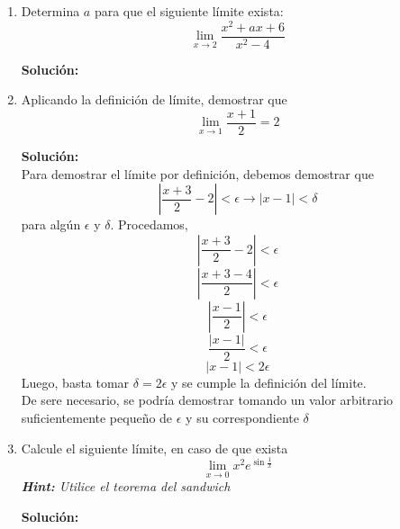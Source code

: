 \documentclass[12pt]{article}
\newenvironment{solucion}
{\begin{mdframed}[backgroundcolor=black!10]
		{\bf Solución:}\\
	}
	{
	\end{mdframed}
}
\newenvironment{preguntas}
{\begin{enumerate}\itemsep12pt
	}
	{
	\end{enumerate}
}
\newcommand{\ra}{\rightarrow}
\begin{document}
\begin{preguntas}
\begin{solucion}
\begin{enumerate}[a)]
\[\begin{array}{rrrrrr}
& 1 & 3& 0 & 4 & 0
\end{array}
\]
por lo que $x^4+2x^3-3x^2+4x-4 : x-1 = x^3+3x^2+4$\\
Luego, $x^4+2x-3 : x-1$, esto es,
\[
\renewcommand\arraystretch{1.5}
\setlength\doublerulesep{0pt}
\begin{array}{rrrrrr}
\multicolumn{1}{r|}{1} & 1 & 0 & 0 & 2 & -3\\\cline{2-6}
& & 1& 1 & 1 & 3\\\cline{2-6}
& 1 & 1& 1 & 3 & 0
\end{array}
\]
por lo que $x^4+2x-3 : x-1 = x^3+x^2+x+3$
Entonces, podemos escribir el límite como
$$\lim\limits_{x \ra 1} \dfrac{(x^3+3x^2+4)(x-1)}{(x^3+x^2+x+3)(x-1)}
= \lim\limits_{x \ra 1} \dfrac{(x^3+3x^2+4)}{(x^3+x^2+x+3)}
= \dfrac{8}{6} = \dfrac{4}{3}$$
\item 
\item 
\end{enumerate}
\end{solucion}
\item Determina $a$ para que el siguiente límite exista:
$$ \lim\limits_{x \ra 2} \dfrac{x^2+ax+6}{x^2-4} $$
\begin{solucion}

\end{solucion}
\item Aplicando la definición de límite, demostrar que
$$\lim\limits_{x \ra 1} \dfrac{x+1}{2} = 2$$
\begin{solucion}
Para demostrar el límite por definición, debemos demostrar que
$$\left| \dfrac{x+3}{2} - 2 \right| < \epsilon \ra |x-1| < \delta$$
para algún $\epsilon$ y $\delta$. Procedamos,
$$\left| \dfrac{x+3}{2} - 2 \right| < \epsilon$$
$$\left| \dfrac{x+3-4}{2} \right| < \epsilon$$
$$\left| \dfrac{x-1}{2} \right| < \epsilon$$
$$ \dfrac{|x-1|}{2} < \epsilon$$
$$ |x-1| < 2\epsilon$$
Luego, basta tomar $\delta = 2 \epsilon$ y se cumple la definición del límite. \\
De sere necesario, se podría demostrar tomando un valor arbitrario suficientemente pequeño de $\epsilon$ y su correspondiente $\delta$
\end{solucion}
\item Calcule el siguiente límite, en caso de que exista
$$ \lim\limits_{x \ra 0} x^2e^{\sin{\frac{1}{x}}} $$
\textit{\textbf{Hint:} Utilice el teorema del sandwich}
\begin{solucion}

\end{solucion}
\end{preguntas}
\end{document}
